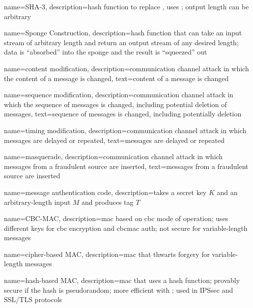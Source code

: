 {
    name={SHA-3},
    description={hash function to replace , uses ; output length can be arbitrary}
}

{
    name={Sponge Construction},
    description={hash function that can take an input stream of arbitrary length and return an output stream of any desired length; data is ``absorbed'' into the sponge and the result is ``squeezed'' out}
}

{
    name={content modification},
    description={communication channel attack in which the content of a message is changed},
    text={content of a message is changed}
}

{
    name={sequence modification},
    description={communication channel attack in which the sequence of messages is changed, including potential deletion of messages},
    text={sequence of messages is changed, including potentially deletion}
}

{
    name={timing modification},
    description={communication channel attack in which messages are delayed or repeated},
    text={messages are delayed or repeated}
}

{
    name={masquerade},
    description={communication channel attack in which messages from a fraudulent source are inserted},
    text={messages from a fraudulent source are inserted}
}

{
    name={message authentication code},
    description={takes a secret key $K$ and an arbitrary-length input $M$ and produces tag $T$}
}

{
    name={CBC-MAC},
    description={\acrshort{mac} based on \acrfull{cbc} mode of operation; uses different keys for \acrshort*{cbc} encryption and \gls*{cbcmac} auth; not secure for variable-length messages}
}

{
    name={cipher-based MAC},
    description={\acrshort{mac} that thwarts forgery for variable-length messages}
}

{
    name={hash-based MAC},
    description={\acrshort{mac} that uses a hash function; provably secure if the hash is pseudorandom; more efficient with ; used in IPSsec and SSL/TLS protocols}
}

